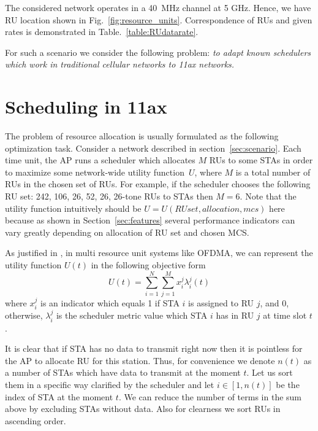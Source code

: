 The considered network operates in a \SI{40}{\MHz} channel at 5 GHz. Hence, we have RU location shown in Fig.~\ref{fig:resource_units}. 
Correspondence of RUs and given rates is demonstrated in Table.~\ref{table:RUdatarate}.

For such a scenario we consider the following problem: \textit{to adapt known schedulers which work in traditional cellular networks to 11ax networks.}

\section{Scheduling in 11ax}
\label{sec:scheduling}

The problem of resource allocation is usually formulated as the following optimization task.
Consider a network described in section~\ref{sec:scenario}.
Each time unit, the AP runs a scheduler which allocates $M$ RUs to some STAs in order to maximize some network-wide utility function~$U$, where $M$ is a total number of RUs in the chosen set of RUs. 
For example, if the scheduler chooses the following RU set: 242, 106, 26, 52, 26, 26-tone RUs to STAs then $M = 6$. 
Note that the utility function intuitively should be $U = U(RU set, allocation, mcs)$ here because as shown in Section~\ref{sec:features} several performance indicators can vary greatly depending on allocation of RU set and chosen MCS.

As justified in \cite{andrews2010scheduling}, in multi resource unit systems like OFDMA, we can represent the utility function $U(t)$ in the following objective form
\begin{equation}
\label{eq:obj}
U(t) = \sum_{i = 1}^{N} \sum_{j = 1}^{M} x_i^j \lambda_i^j (t)
\end{equation}
where $x_i^j$ is an indicator which equals 1 if STA $i$ is assigned to RU $j$, and 0, otherwise, $\lambda_i^j$ is the scheduler metric value which STA $i$ has in RU $j$ at time slot $t$. 

It is clear that if STA has no data to transmit right now then it is pointless for the AP to allocate RU for this station. Thus, for convenience we denote $n(t)$ as a number of STAs which have data to transmit at the moment $t$. Let us sort them in a specific way clarified by the scheduler and let $i\in[1, n(t)]$ be the index of STA at the moment $t$. We can reduce the number of terms in the sum above by excluding STAs without data. Also for clearness we sort RUs in ascending order.

